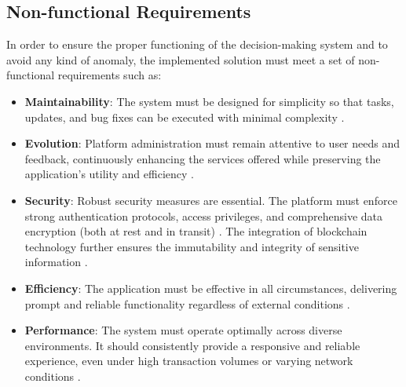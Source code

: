 \subsection{Non-functional Requirements}

In order to ensure the proper functioning of the decision-making system and to avoid any kind of anomaly, the implemented solution must meet a set of non-functional requirements such as:

\begin{itemize}
    \item \textbf{Maintainability}: The system must be designed for simplicity so that tasks, updates, and bug fixes can be executed with minimal complexity \cite{DevOpsFoundation2023, FowlerRefactoring2018}.
    
    \item \textbf{Evolution}: Platform administration must remain attentive to user needs and feedback, continuously enhancing the services offered while preserving the application's utility and efficiency \cite{PoppendieckLean2012, KnibergLeanStartup2013}.
    
    \item \textbf{Security}: Robust security measures are essential. The platform must enforce strong authentication protocols, access privileges, and comprehensive data encryption (both at rest and in transit) \cite{ClerkAuthenticationDocs, OWASPSecurityPrinciples2021}. The integration of blockchain technology further ensures the immutability and integrity of sensitive information \cite{WangBlockchainRealEstate2023, McKinseyBlockchainRE2023}.
    
    \item \textbf{Efficiency}: The application must be effective in all circumstances, delivering prompt and reliable functionality regardless of external conditions \cite{KimDevOpsMethods2018, BassArchitecture2021}.
    
    \item \textbf{Performance}: The system must operate optimally across diverse environments. It should consistently provide a responsive and reliable experience, even under high transaction volumes or varying network conditions \cite{DockerArchitecture2023, ForsgreniDevOpsMetrics2023}.
\end{itemize} 


